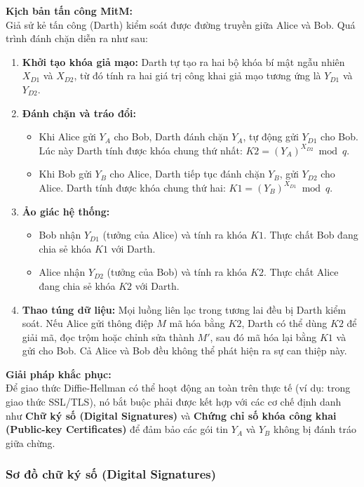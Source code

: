 \textbf{Kịch bản tấn công MitM:} \\
Giả sử kẻ tấn công (Darth) kiểm soát được đường truyền giữa Alice và Bob. Quá trình đánh chặn diễn ra như sau:
\begin{enumerate}
    \item \textbf{Khởi tạo khóa giả mạo:} Darth tự tạo ra hai bộ khóa bí mật ngẫu nhiên $X_{D1}$ và $X_{D2}$, từ đó tính ra hai giá trị công khai giả mạo tương ứng là $Y_{D1}$ và $Y_{D2}$.
    \item \textbf{Đánh chặn và tráo đổi:}
    \begin{itemize}
        \item Khi Alice gửi $Y_A$ cho Bob, Darth đánh chặn $Y_A$, tự động gửi $Y_{D1}$ cho Bob. Lúc này Darth tính được khóa chung thứ nhất: $K2 = (Y_A)^{X_{D2}} \bmod q$.
        \item Khi Bob gửi $Y_B$ cho Alice, Darth tiếp tục đánh chặn $Y_B$, gửi $Y_{D2}$ cho Alice. Darth tính được khóa chung thứ hai: $K1 = (Y_B)^{X_{D1}} \bmod q$.
    \end{itemize}
    \item \textbf{Ảo giác hệ thống:}
    \begin{itemize}
        \item Bob nhận $Y_{D1}$ (tưởng của Alice) và tính ra khóa $K1$. Thực chất Bob đang chia sẻ khóa $K1$ với Darth.
        \item Alice nhận $Y_{D2}$ (tưởng của Bob) và tính ra khóa $K2$. Thực chất Alice đang chia sẻ khóa $K2$ với Darth.
    \end{itemize}
    \item \textbf{Thao túng dữ liệu:} Mọi luồng liên lạc trong tương lai đều bị Darth kiểm soát. Nếu Alice gửi thông điệp $M$ mã hóa bằng $K2$, Darth có thể dùng $K2$ để giải mã, đọc trộm hoặc chỉnh sửa thành $M'$, sau đó mã hóa lại bằng $K1$ và gửi cho Bob. Cả Alice và Bob đều không thể phát hiện ra sự can thiệp này.
\end{enumerate}

\textbf{Giải pháp khắc phục:} \\
Để giao thức Diffie-Hellman có thể hoạt động an toàn trên thực tế (ví dụ: trong giao thức SSL/TLS), nó bắt buộc phải được kết hợp với các cơ chế định danh như \textbf{Chữ ký số (Digital Signatures)} và \textbf{Chứng chỉ số khóa công khai (Public-key Certificates)} để đảm bảo các gói tin $Y_A$ và $Y_B$ không bị đánh tráo giữa chừng.
\subsubsection*{Sơ đồ chữ ký số (Digital Signatures)}

